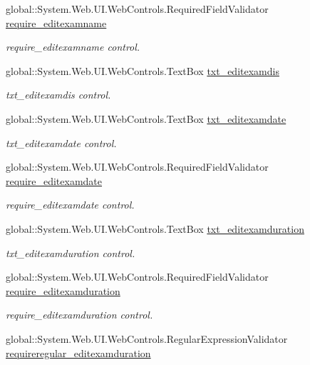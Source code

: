 \begin{DoxyCompactItemize}
global\+::\+System.\+Web.\+U\+I.\+Web\+Controls.\+Required\+Field\+Validator \mbox{\hyperlink{classeditexam_ae16c183b6fd56d9c7a91d3fcd4fb8c51}{require\+\_\+editexamname}}
\begin{DoxyCompactList}\small\item\em require\+\_\+editexamname control. \end{DoxyCompactList}\item 
global\+::\+System.\+Web.\+U\+I.\+Web\+Controls.\+Text\+Box \mbox{\hyperlink{classeditexam_a987cce3dfa50472482bc66cfdb44f481}{txt\+\_\+editexamdis}}
\begin{DoxyCompactList}\small\item\em txt\+\_\+editexamdis control. \end{DoxyCompactList}\item 
global\+::\+System.\+Web.\+U\+I.\+Web\+Controls.\+Text\+Box \mbox{\hyperlink{classeditexam_a6f4f3b5e57f0060b59c62a60f343e229}{txt\+\_\+editexamdate}}
\begin{DoxyCompactList}\small\item\em txt\+\_\+editexamdate control. \end{DoxyCompactList}\item 
global\+::\+System.\+Web.\+U\+I.\+Web\+Controls.\+Required\+Field\+Validator \mbox{\hyperlink{classeditexam_a3255939b3509facda88675d9fd46c1a6}{require\+\_\+editexamdate}}
\begin{DoxyCompactList}\small\item\em require\+\_\+editexamdate control. \end{DoxyCompactList}\item 
global\+::\+System.\+Web.\+U\+I.\+Web\+Controls.\+Text\+Box \mbox{\hyperlink{classeditexam_ad8d76cc3c0c1f860541d24483f5f47de}{txt\+\_\+editexamduration}}
\begin{DoxyCompactList}\small\item\em txt\+\_\+editexamduration control. \end{DoxyCompactList}\item 
global\+::\+System.\+Web.\+U\+I.\+Web\+Controls.\+Required\+Field\+Validator \mbox{\hyperlink{classeditexam_abc133b98e41b6abfd8a863129aca0ce5}{require\+\_\+editexamduration}}
\begin{DoxyCompactList}\small\item\em require\+\_\+editexamduration control. \end{DoxyCompactList}\item 
global\+::\+System.\+Web.\+U\+I.\+Web\+Controls.\+Regular\+Expression\+Validator \mbox{\hyperlink{classeditexam_abb1ab1eb9831d41f61faf699e4051ef1}{requireregular\+\_\+editexamduration}}

\end{DoxyCompactItemize}
